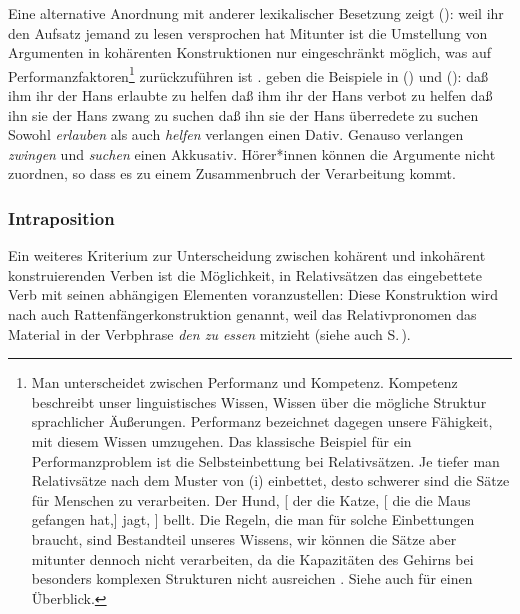 Eine alternative Anordnung mit anderer lexikalischer Besetzung zeigt ():
\ea 
weil    ihr den Aufsatz jemand   zu lesen versprochen hat
\z
Mitunter ist die Umstellung von Argumenten in kohärenten Konstruktionen nur eingeschränkt möglich,
was auf Performanzfaktoren\footnote{
  Man unterscheidet zwischen Performanz und Kompetenz. Kompetenz beschreibt unser linguistisches
  Wissen, \dash Wissen über die mögliche Struktur sprachlicher Äußerungen. Performanz bezeichnet
  dagegen unsere Fähigkeit, mit diesem Wissen umzugehen. Das klassische Beispiel für ein
  Performanzproblem ist die Selbsteinbettung bei Relativsätzen. Je tiefer man Relativsätze nach dem
  Muster von (i) einbettet, desto schwerer sind die Sätze für Menschen zu verarbeiten.
\ea
Der Hund, [ der die Katze, [ die die Maus gefangen hat,] jagt, ] bellt.
\z
Die Regeln, die man für solche Einbettungen braucht, sind Bestandteil unseres Wissens, wir können
die Sätze aber mitunter dennoch nicht verarbeiten, da die Kapazitäten des Gehirns bei besonders
komplexen Strukturen nicht ausreichen \citep{MC63a-u}. Siehe auch
 für einen Überblick.%
} zurückzuführen ist \citep[]{BK89a}.
\citeauthor{BK89a} geben die Beispiele in () und ():
\eal
\ex daß ihm ihr der Hans erlaubte zu helfen
\ex daß ihm ihr der Hans verbot zu helfen 
\zl
\eal
\ex daß ihn sie der Hans zwang zu suchen
\ex daß ihn sie der Hans überredete zu suchen
\zl
Sowohl \emph{erlauben} als auch \emph{helfen} verlangen einen Dativ. Genauso verlangen
\emph{zwingen} und \emph{suchen} einen Akkusativ. Hörer*innen können die Argumente nicht zuordnen,
so dass es zu einem Zusammenbruch der Verarbeitung kommt.




\subsubsection{Intraposition}

Ein weiteres Kriterium zur Unterscheidung zwischen kohärent und inkohärent
konstruierenden Verben ist die Möglichkeit, in Relativsätzen das eingebettete Verb mit
seinen abhängigen Elementen voranzustellen:
\eal
\label{inkohaerenz-rs}
\zl
Diese Konstruktion wird nach \citet*[]{Ross67} 
auch Rattenfängerkonstruktion genannt,
weil das Relativpronomen das Material in der Verbphrase \emph{den zu essen} mitzieht (siehe auch S.\,\pageref{page-rattenfaenger}).

